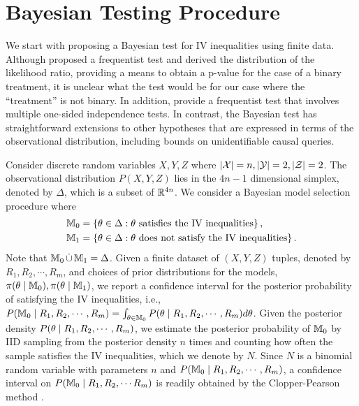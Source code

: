 \section{Bayesian Testing Procedure} \label{sec:bayesiantest}

We start with proposing a Bayesian test for IV inequalities using finite data. Although  \citet{Ramsahai08} proposed a frequentist test and derived the distribution of the likelihood ratio, providing a means to obtain a p-value for the case of a binary treatment, it is unclear what the test would be for our case where the ``treatment'' is not binary. In addition, \citet{WangRR17} provide a frequentist test that involves multiple one-sided independence tests. In contrast, the Bayesian test has straightforward extensions to other hypotheses that are expressed in terms of the observational distribution, including bounds on unidentifiable causal queries.

Consider discrete random variables $X,Y,Z$ where $|{\cal X}|=n, |{\cal Y}|=2, |{\cal Z}|=2$. The observational distribution $P(X,Y,Z)$ lies in the $4n-1$ dimensional simplex, denoted by $\Delta$, which is a subset of $\mathbb{R}^{4n}$. We consider a Bayesian model selection procedure where 
\begin{align*}
    \mathbb{M}_0 &= \left \lbrace \theta \in \Delta : \theta \text{ satisfies the IV inequalities} \right \rbrace, \\
    \mathbb{M}_1 &= \left \lbrace \theta \in \Delta : \theta \text{ does not satisfy the IV inequalities} \right \rbrace.
\end{align*}
Note that $\mathbb{M}_0 \,\dot{\cup}\, \mathbb{M}_1 = \Delta$. Given a finite dataset of $(X,Y,Z)$ tuples, denoted by $R_1, R_2, \cdots, R_m$, and choices of prior distributions for the models, $\pi{\left({\theta\mid\mathbb{M}_0}\right)},\pi{\left({\theta\mid\mathbb{M}_1}\right)}$, we report a confidence interval for the posterior probability of satisfying the IV inequalities, i.e., $P{\left({\mathbb{M}_0\mid R_1,R_2, \cdots, R_m}\right)} = \int_{\theta \in \mathbb{M}_0} P{\left({\theta \mid R_1,R_2, \cdots, R_m}\right)} d\theta$. Given the posterior density $P{\left({\theta \mid R_1,R_2, \cdots, R_m}\right)}$, we estimate the posterior probability of $\mathbb{M}_0$ by IID sampling from the posterior density $n$ times and counting how often the sample satisfies the IV inequalities, which we denote by $N$. Since $N$ is a binomial random variable with parameters $n$ and $P{\left({\mathbb{M}_0\mid R_1,R_2, \cdots ,R_m}\right)}$, a confidence interval on $P{\left({\mathbb{M}_0 \mid R_1,R_2, \cdots R_m}\right)}$ is readily obtained by the Clopper-Pearson method \citep{ClopperPearson34}.

